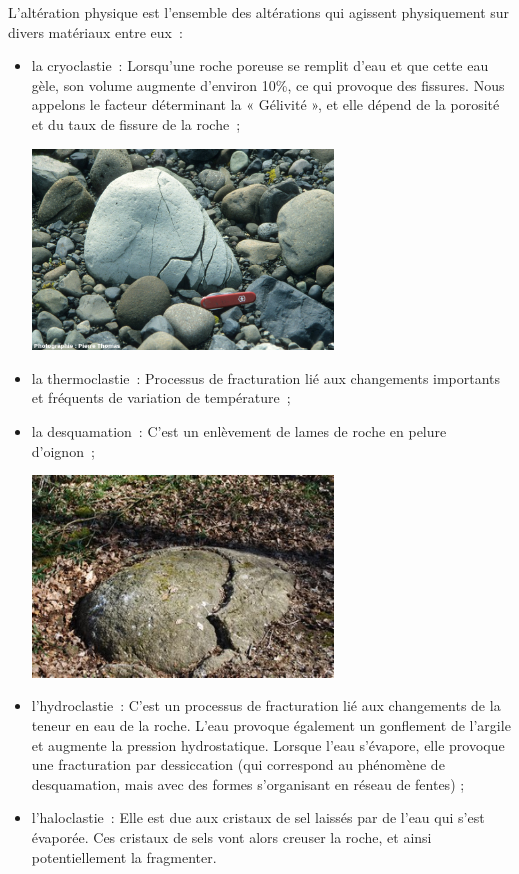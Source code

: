\documentclass[a4paper,11pt]{article}
\begin{document}
L'altération physique est l'ensemble des altérations qui agissent physiquement sur divers matériaux entre eux~:
\begin{itemize}
  \item la cryoclastie~: Lorsqu'une roche poreuse se remplit d'eau et que cette eau gèle, son volume augmente d'environ 10\%, ce qui provoque des fissures.
  Nous appelons le facteur déterminant la « Gélivité », et elle dépend de la porosité et du taux de fissure de la roche~;

  \medbreak
  \begin{center}
    \includegraphics[width=8cm]{Images/Erosion/cryoclastie.jpg}
  \end{center}
  \medbreak

  \item la thermoclastie~: Processus de fracturation lié aux changements importants et fréquents de variation de température~;
  \item la desquamation~: C'est un enlèvement de lames de roche en pelure d'oignon~;

  \medbreak
  \begin{center}
    \includegraphics[width=8cm]{Images/Erosion/desquamation.jpg}
  \end{center}
  \medbreak
  
  \item l'hydroclastie~: C'est un processus de fracturation lié aux changements de la teneur en eau de la roche. L'eau provoque également un gonflement de l'argile et augmente la pression hydrostatique.
  Lorsque l'eau s'évapore, elle provoque une fracturation par dessiccation (qui correspond au phénomène de desquamation, mais avec des formes s'organisant en réseau de fentes) ;
  \item l'haloclastie~: Elle est due aux cristaux de sel laissés par de l'eau qui s'est évaporée. Ces cristaux de sels vont alors creuser la roche, et ainsi potentiellement la fragmenter.


\end{itemize}
\end{document}
